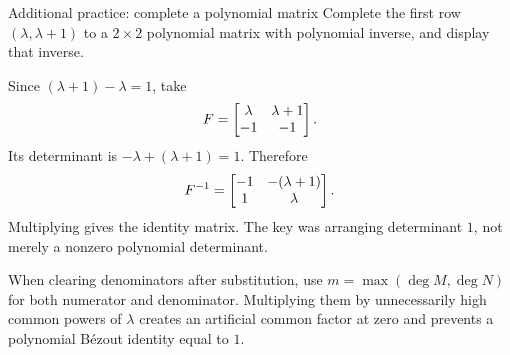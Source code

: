 \begin{question}{Additional practice: complete a polynomial matrix}
Complete the first row $(\lambda,\lambda+1)$ to a $2\times2$ polynomial matrix with polynomial inverse, and display that inverse.
\end{question}
\begin{answer}
Since $(\lambda+1)-\lambda=1$, take
\[F=\begin{bmatrix}\lambda&\lambda+1\\-1&-1\end{bmatrix}.\]
Its determinant is $-\lambda+(\lambda+1)=1$. Therefore
\[F^{-1}=\begin{bmatrix}-1&-(\lambda+1)\\1&\lambda\end{bmatrix}.\]
Multiplying gives the identity matrix. The key was arranging determinant $1$, not merely a nonzero polynomial determinant.
\end{answer}
\begin{tip}
When clearing denominators after substitution, use $m=\max(\deg M,\deg N)$ for both numerator and denominator. Multiplying them by unnecessarily high common powers of $\lambda$ creates an artificial common factor at zero and prevents a polynomial B\'ezout identity equal to $1$.
\end{tip}


